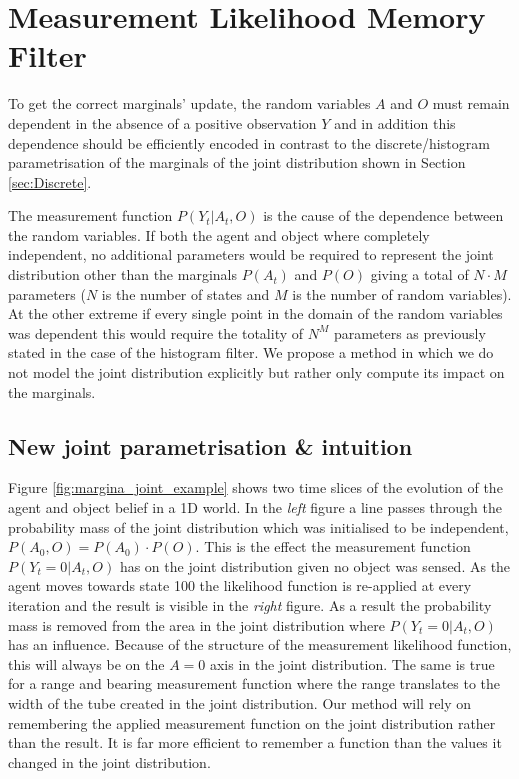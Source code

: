 \FloatBarrier
\section{Measurement Likelihood Memory Filter}\label{ch5:MLMF}

To get the correct marginals' update, the random variables $A$ and $O$ must remain 
dependent in the absence of a positive observation $Y$ and in addition this dependence should be efficiently encoded in contrast to the
discrete/histogram parametrisation of the marginals of the joint distribution shown in Section \ref{sec:Discrete}. 

The measurement function $P(Y_t|A_t,O)$ is the cause of the dependence between the random variables. If both the agent and object 
where completely independent, no additional parameters would be required to represent the joint distribution other than the marginals 
$P(A_t)$ and $P(O)$ giving a total of $N \cdot M$ parameters ($N$ is the number of states and $M$ is the number of random variables). 
At the other extreme if every single point in the domain of the random variables was dependent this would require the totality 
of $N^M$ parameters as previously stated in the case of the histogram filter. We propose a method in which we do not model the joint
distribution explicitly but rather only compute its impact on the marginals. 

\subsection{New joint parametrisation \& intuition}

Figure \ref{fig:margina_joint_example} shows two time slices of the evolution of the agent and object belief in a 1D world. In the \textit{left}
figure a line passes through the probability mass of the joint distribution which was initialised to be independent,
$P(A_0,O) = P(A_0) \cdot P(O)$. 
This is the effect the measurement function $P(Y_t=0|A_t,O)$ has on the joint distribution given no object was sensed. As the agent 
moves towards state 100 the likelihood function is re-applied at every iteration and the result is visible in the \textit{right} figure. 
As a result the probability mass is removed from the area in the joint distribution where $P(Y_t=0|A_t,O)$ has an influence.
Because of the structure of the measurement likelihood function, this will always be on the $A=0$ axis in the joint distribution. 
The same is true for a range and bearing measurement function where the range translates to the width of the tube created in the 
joint distribution. Our method will rely on remembering the applied measurement function on the joint distribution rather than the result. 
It is far more efficient to remember a function than the values it changed in the
joint distribution.

